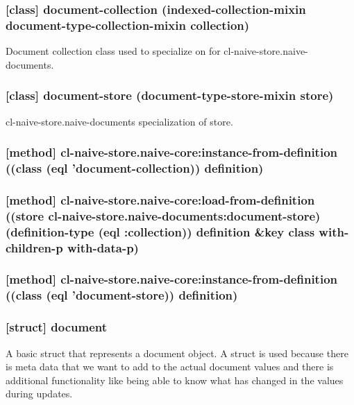 \documentclass[11pt]{article}
\begin{document}
\subsubsection{[class] document-collection (indexed-collection-mixin document-type-collection-mixin collection)}
\label{sec:org464bd74}

Document collection class used to specialize on for cl-naive-store.naive-documents.

\subsubsection{[class] document-store (document-type-store-mixin store)}
\label{sec:org331ba91}

cl-naive-store.naive-documents specialization of store.

\subsubsection{[method] cl-naive-store.naive-core:instance-from-definition ((class (eql 'document-collection)) definition)}
\label{sec:orge42f084}

\subsubsection{[method] cl-naive-store.naive-core:load-from-definition ((store cl-naive-store.naive-documents:document-store) (definition-type (eql :collection)) definition \&key class with-children-p with-data-p)}
\label{sec:orga0d333a}

\subsubsection{[method] cl-naive-store.naive-core:instance-from-definition ((class (eql 'document-store)) definition)}
\label{sec:org177eeea}

\subsubsection{[struct] document}
\label{sec:org2482936}
A basic struct that represents a document object. A struct is used
because there is meta data that we want to add to the actual document
values and there is additional functionality like being able to know
what has changed in the values during updates.
\end{document}
